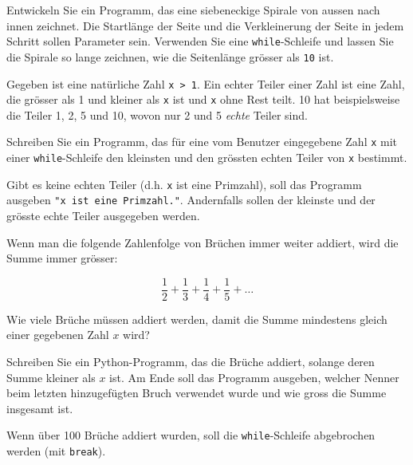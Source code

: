 \begin{myexercise}
	Entwickeln Sie ein Programm, das eine siebeneckige Spirale von aussen nach innen zeichnet. Die Startlänge der Seite und die Verkleinerung der Seite in jedem Schritt sollen Parameter sein. Verwenden Sie eine \lstinline|while|-Schleife und lassen Sie die Spirale so lange zeichnen, wie die Seitenlänge grösser als \lstinline|10| ist.
	\begin{myanswer}
		
	\end{myanswer}
\end{myexercise}

\begin{myexercise}
	Gegeben ist eine natürliche Zahl \lstinline|x > 1|. Ein echter Teiler einer Zahl ist eine Zahl, die grösser als 1 und kleiner als \lstinline|x| ist und \lstinline|x| ohne Rest teilt. 10 hat beispielsweise die Teiler 1, 2, 5 und 10, wovon nur 2 und 5 \textit{echte} Teiler sind.

	Schreiben Sie ein Programm, das für eine vom Benutzer eingegebene Zahl \lstinline|x| mit einer \lstinline|while|-Schleife den kleinsten und den grössten echten Teiler von \lstinline|x| bestimmt.

	Gibt es keine echten Teiler (d.h. \lstinline|x| ist eine Primzahl), soll das Programm ausgeben \lstinline|"x ist eine Primzahl."|. Andernfalls sollen der kleinste und der grösste echte Teiler ausgegeben werden.

	\begin{myanswer}
		
	\end{myanswer}
\end{myexercise}

\begin{myexercise}
	Wenn man die folgende Zahlenfolge von Brüchen immer weiter addiert, wird die Summe immer grösser:

	\[
		\frac{1}{2} + \frac{1}{3} + \frac{1}{4} + \frac{1}{5} + \dots
	\]

	Wie viele Brüche müssen addiert werden, damit die Summe mindestens gleich einer gegebenen Zahl $x$ wird?

	Schreiben Sie ein Python-Programm, das die Brüche addiert, solange deren Summe kleiner als $x$ ist. Am Ende soll das Programm ausgeben, welcher Nenner beim letzten hinzugefügten Bruch verwendet wurde und wie gross die Summe insgesamt ist.

	Wenn über 100 Brüche addiert wurden, soll die \lstinline|while|-Schleife abgebrochen werden (mit \lstinline|break|).
	\begin{myanswer}
		
	\end{myanswer}
\end{myexercise}

